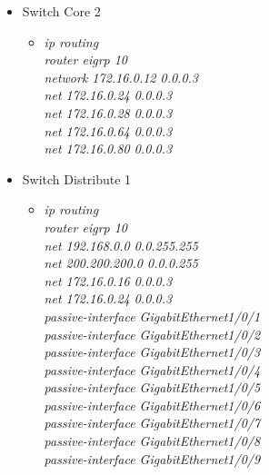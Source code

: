 \documentclass[a4paper, 12pt]{article}
\begin{document}
\begin{itemize}
\begin{itemize}
\begin{itemize}
          \end{itemize}
             \item Switch Core 2
        \begin{itemize}
         \item \textit{ip routing\\
                        router eigrp 10\\
                        network 172.16.0.12 0.0.0.3\\
                        net 172.16.0.24 0.0.0.3 \\
                        net 172.16.0.28 0.0.0.3 \\
                        net 172.16.0.64 0.0.0.3\\
                        net 172.16.0.80 0.0.0.3 \\}
         
          \end{itemize}
             \item Switch Distribute 1
        \begin{itemize}
         \item \textit{ip routing\\
                        router eigrp 10\\
                        net 192.168.0.0 0.0.255.255 \\
                        net 200.200.200.0 0.0.0.255 \\
                        net 172.16.0.16 0.0.0.3 \\
                        net 172.16.0.24 0.0.0.3\\
                        passive-interface GigabitEthernet1/0/1\\
                        passive-interface GigabitEthernet1/0/2\\
                        passive-interface GigabitEthernet1/0/3\\
                        passive-interface GigabitEthernet1/0/4\\
                        passive-interface GigabitEthernet1/0/5\\
                        passive-interface GigabitEthernet1/0/6\\
                        passive-interface GigabitEthernet1/0/7\\
                        passive-interface GigabitEthernet1/0/8\\
                        passive-interface GigabitEthernet1/0/9\\}
         

\end{itemize}
\end{itemize}
\end{itemize}
\end{document}

